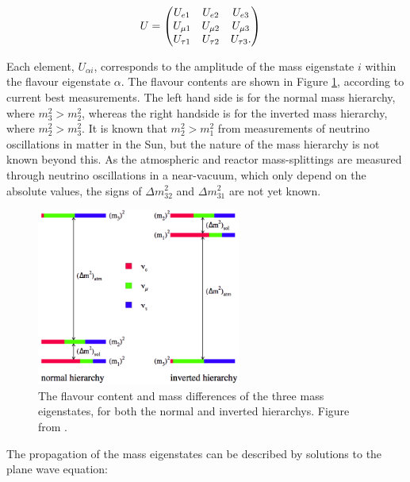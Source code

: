\begin{equation}
\begin{aligned}
U & =
\begin{pmatrix}
U_{e1} & U_{e2} & U_{e 3}\\
U_{\mu 1} & U_{\mu 2} & U_{\mu 3} \\
U_{\tau 1} & U_{\tau 2} & U_{\tau 3}.
\end{pmatrix}
\end{aligned}
\vspace{8pt}
\end{equation}

Each element, $U_{\alpha i}$, corresponds to the amplitude of the mass eigenstate $i$ within the flavour eigenstate $\alpha$. The flavour contents are shown in Figure \ref{hierarchy}, according to current best measurements. The left hand side is for the normal mass hierarchy, where $m_3^2 > m_2^2$, whereas the right handside is for the inverted mass hierarchy, where $m_2^2 > m_3^2$. It is known that $m_2^2 > m_1^2$ from measurements of neutrino oscillations in matter in the Sun, but the nature of the mass hierarchy is not known beyond this. As the atmospheric and reactor mass-splittings are measured through neutrino oscillations in a near-vacuum, which only depend on the absolute values, the signs of $\Delta m_{32}^2$ and $\Delta m_{31}^2$ are not yet known.

\begin{figure}[!htbp]
\vspace{20pt}
\centering
\includegraphics*[width=0.6\textwidth,clip]{figs/hierfig}
\caption{The flavour content and mass differences of the three mass eigenstates, for both the normal and inverted hierarchys. Figure from \cite{hierarchyplot}.} \label{hierarchy}
\end{figure}

The propagation of the mass eigenstates can be described by solutions to the plane wave equation:

